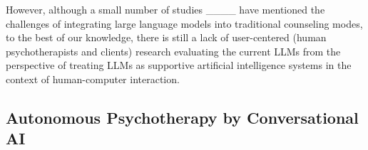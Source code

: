 
However, although a small number of studies ____ have mentioned the challenges of integrating large language models into traditional counseling modes, to the best of our knowledge, there is still a lack of user-centered (human psychotherapists and clients) research evaluating the current LLMs from the perspective of treating LLMs as supportive artificial intelligence systems in the context of human-computer interaction.

\subsection{Autonomous Psychotherapy by Conversational AI}


